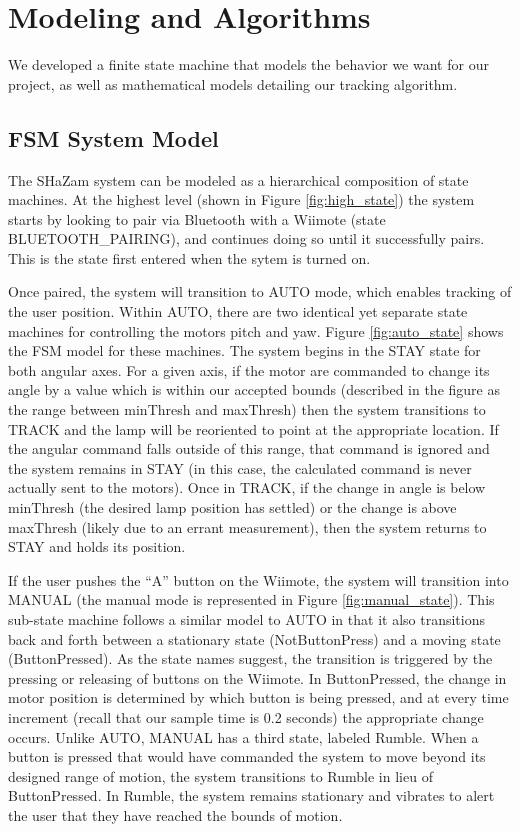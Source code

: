 \documentclass[conference, twocolumn]{IEEEtran}
\begin{document}
\section{Modeling and Algorithms}
\label{sec:algorithms}
We developed a finite state machine that models the behavior we want for our project, as well as mathematical models detailing our tracking algorithm.
 
 \subsection{FSM System Model}
 The SHaZam system can be modeled as a hierarchical composition of state machines. At the highest level (shown in Figure \ref{fig:high_state}) the system starts by looking to pair via Bluetooth with a Wiimote (state BLUETOOTH\_PAIRING), and continues doing so until it successfully pairs. This is the state first entered when the sytem is turned on.
 
 Once paired, the system will transition to AUTO mode, which enables tracking of the user position. Within AUTO, there are two identical yet separate state machines for controlling the motors pitch and yaw. Figure \ref{fig:auto_state} shows the FSM model for these machines. The system begins in the STAY state for both angular axes. For a given axis, if the motor are commanded to change its angle by a value which is within our accepted bounds (described in the figure as the range between minThresh and maxThresh) then the system transitions to TRACK and the lamp will be reoriented to point at the appropriate location. If the angular command falls outside of this range, that command is ignored and the system remains in STAY (in this case, the calculated command is never actually sent to the motors). Once in TRACK, if the change in angle is below minThresh (the desired lamp position has settled) or the change is above maxThresh (likely due to an errant measurement), then the system returns to STAY and holds its position.
 
If the user pushes the ``A'' button on the Wiimote, the system will transition into MANUAL (the manual mode is represented in Figure \ref{fig:manual_state}). This sub-state machine follows a similar model to AUTO in that it also transitions back and forth between a stationary state (NotButtonPress) and a moving state (ButtonPressed). As the state names suggest, the transition is triggered by the pressing or releasing of buttons on the Wiimote. In ButtonPressed, the change in motor position is determined by which button is being pressed, and at every time increment (recall that our sample time is 0.2 seconds) the appropriate change occurs. Unlike AUTO, MANUAL has a third state, labeled Rumble. When a button is pressed that would have commanded the system to move beyond its designed range of motion, the system transitions to Rumble in lieu of ButtonPressed. In Rumble, the system remains stationary and vibrates to alert the user that they have reached the bounds of motion.
\end{document}
